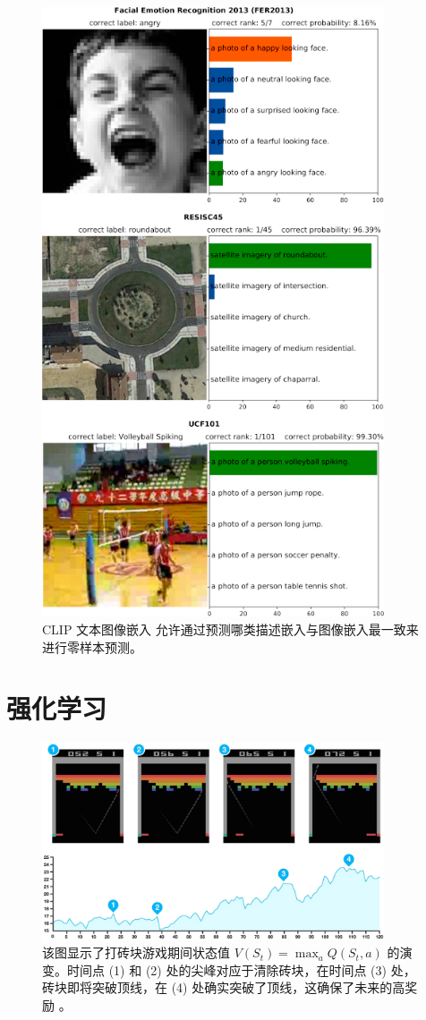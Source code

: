 \begin{figure}
    \centering
    \includegraphics[width=0.9\textwidth]{fig/fig6.4.png}
    \caption[CLIP 零样本预测]{CLIP 文本图像嵌入 \citep{arxiv-2103.00020} 允许通过预测哪类描述嵌入与图像嵌入最一致来进行零样本预测。 }
    \label{fig6.4}
\end{figure}

\section{强化学习}\label{sec6.7}

\begin{figure}
    \centering
    \includegraphics[width=0.9\textwidth]{fig/fig6.5.png}
    \caption[DQN 状态值演化]{该图显示了打砖块游戏期间状态值 $V(S_t)=\max_aQ(S_t,a)$ 的演变。时间点 (1) 和 (2) 处的尖峰对应于清除砖块，在时间点 (3) 处，砖块即将突破顶线，在 (4) 处确实突破了顶线，这确保了未来的高奖励 \citep{nature14236}。}
    \label{fig6.5}
\end{figure}